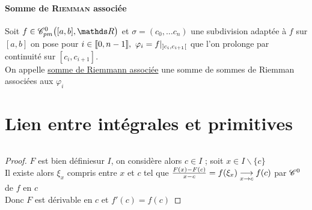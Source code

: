 		\paragraph{Somme de \textsc{Riemman} associée}
			Soit $f\in\cpm$ et $\sigma = (c_0,\dots c_n)$ une subdivision adaptée à $f$ sur $[a,b]$ on pose pour $i\in\llbracket 0,n-1 \rrbracket , ~\varphi_i = 
			f|_{]c_i,c_{i+1}[}$ que l'on prolonge par continuité sur $[c_i,c_{i+1}]$. \\ On appelle \underline{somme de Riemmann associée} 
			une somme de sommes de Riemman associées aux $\varphi_i$ \trait
	\section{Lien entre intégrales et primitives}
		${}$\\ 
		\begin{proof}
		$F$ est bien définiesur $I$, on considère alors $c\in I$ ; soit $x\in I\backslash\{c\}$ \\ Il existe alors $\xi_x$ compris entre $x$ et $c$ 
		tel que $\frac{F(x)-F(c)}{x-c} = f(\xi_x) \underset{x\to c}{\longrightarrow} f(c)$ par ${\mathscr{C}}^0$ de $f$ en $c$ \\ Donc $F$ est dérivable en $c$ et $f'(c)=f(c)$
		\end{proof}
		${}$ \\ 
		\vspace*{0.5cm} \\  \\
